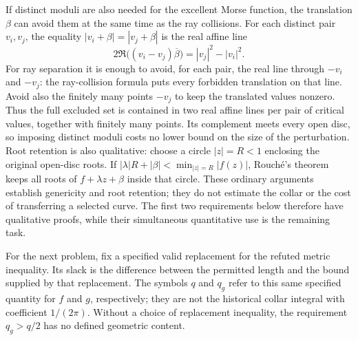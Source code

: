 \documentclass[11pt]{article}
\begin{document}
If distinct moduli are also needed for the excellent Morse function,
the translation $\beta$ can avoid them at the same time as the ray
collisions. For each distinct pair $v_i,v_j$, the equality
$|v_i+\beta|=|v_j+\beta|$ is the real affine line
\[
 2\Re\bigl((v_i-v_j)\overline\beta\bigr)=|v_j|^2-|v_i|^2.
\]
For ray separation it is enough to avoid, for each pair, the real line
through $-v_i$ and $-v_j$: the ray-collision formula puts every forbidden
translation on that line. Avoid also the finitely many points $-v_j$
to keep the translated values nonzero. Thus the full excluded set is
contained in two real affine lines per pair of critical values,
together with finitely many points. Its complement meets every open
disc, so imposing distinct moduli costs no lower bound on the size
of the perturbation.
Root retention is also qualitative: choose a circle $|z|=R<1$
enclosing the original open-disc roots. If
$|\lambda|R+|\beta|<\min_{|z|=R}|f(z)|$, Rouch\'e's theorem
keeps all roots of $f+\lambda z+\beta$ inside that circle.
These ordinary arguments establish genericity and root retention;
they do not estimate the collar or the cost of transferring a selected
curve. The first two requirements below therefore have qualitative
proofs, while their simultaneous quantitative use is the remaining task.

For the next problem, fix a specified valid replacement for the refuted
metric inequality. Its slack is the difference between the permitted
length and the bound supplied by that replacement. The symbols $q$ and
$q_g$ refer to this same specified quantity for $f$ and $g$, respectively;
they are not the historical collar integral with coefficient $1/(2\pi)$.
Without a choice of replacement inequality, the requirement $q_g>q/2$
has no defined geometric content.
\end{document}
